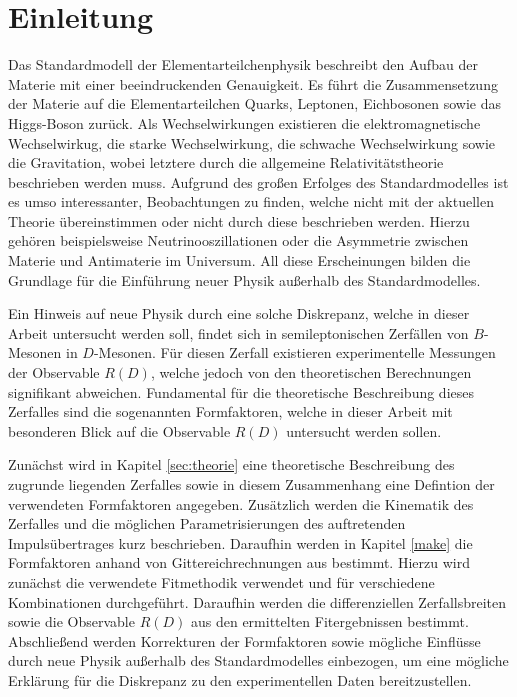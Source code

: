 \chapter{Einleitung}

Das Standardmodell der Elementarteilchenphysik beschreibt den Aufbau der Materie mit einer beeindruckenden Genauigkeit.
Es führt die Zusammensetzung der Materie auf die Elementarteilchen Quarks, Leptonen, Eichbosonen sowie das Higgs-Boson zurück.
Als Wechselwirkungen existieren die elektromagnetische Wechselwirkug, die starke Wechselwirkung, die schwache Wechselwirkung sowie die Gravitation, wobei letztere durch die allgemeine Relativitätstheorie beschrieben werden muss.
Aufgrund des großen Erfolges des Standardmodelles ist es umso interessanter, Beobachtungen zu finden, welche nicht mit der aktuellen Theorie übereinstimmen oder nicht durch diese beschrieben werden.
Hierzu gehören beispielsweise Neutrinooszillationen oder die Asymmetrie zwischen Materie und Antimaterie im Universum.
All diese Erscheinungen bilden die Grundlage für die Einführung neuer Physik außerhalb des Standardmodelles.

Ein Hinweis auf neue Physik durch eine solche Diskrepanz, welche in dieser Arbeit untersucht werden soll, findet sich in semileptonischen Zerfällen von $B$-Mesonen in $D$-Mesonen.
Für diesen Zerfall existieren experimentelle Messungen der Observable $R(D)$, welche jedoch von den theoretischen Berechnungen signifikant abweichen.
Fundamental für die theoretische Beschreibung dieses Zerfalles sind die sogenannten Formfaktoren, welche in dieser Arbeit mit besonderen Blick auf die Observable $R(D)$ untersucht werden sollen.

Zunächst wird in Kapitel \ref{sec:theorie} eine theoretische Beschreibung des zugrunde liegenden Zerfalles sowie in diesem Zusammenhang eine Defintion der verwendeten Formfaktoren angegeben.
Zusätzlich werden die Kinematik des Zerfalles und die möglichen Parametrisierungen des auftretenden Impulsübertrages kurz beschrieben.
Daraufhin werden in Kapitel \ref{make} die Formfaktoren anhand von Gittereichrechnungen aus \cite{PhysRevD.92.034506} bestimmt.
Hierzu wird zunächst die verwendete Fitmethodik verwendet und für verschiedene Kombinationen durchgeführt.
Daraufhin werden die differenziellen Zerfallsbreiten sowie die Observable $R(D)$ aus den ermittelten Fitergebnissen bestimmt.
Abschließend werden Korrekturen der Formfaktoren sowie mögliche Einflüsse durch neue Physik außerhalb des Standardmodelles einbezogen, um eine mögliche Erklärung für die Diskrepanz zu den experimentellen Daten bereitzustellen.
